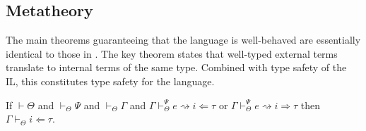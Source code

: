 \documentclass{sig-alternate}[10pt]
\newcommand{\myvdash}{\vdash_{\Theta}^{\Psi}}
\begin{document}



\subsection{Metatheory}
The main theorems guaranteeing that the language is well-behaved are essentially identical to those in \cite{TSLs}. The key theorem states that well-typed external terms translate to internal terms of the same type. Combined with type safety of the IL, this constitutes type safety for the language.

\begin{theorem}
If $\vdash\Theta$ and $\vdash_{\Theta}\Psi$ and $\vdash_{\Theta}\Gamma$ and $\Gamma\vdash_{\Theta}^{\Psi} e\rightsquigarrow i\Leftarrow\tau$ or $\Gamma\vdash_{\Theta}^{\Psi} e\rightsquigarrow i\Rightarrow\tau$ then $\Gamma\vdash_{\Theta} i\Leftarrow\tau$.
\end{theorem}
\end{document}
